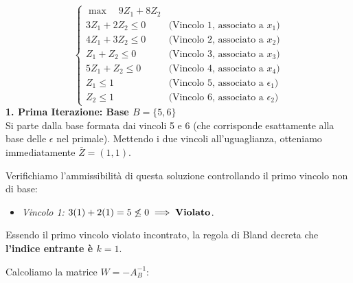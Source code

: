 \documentclass[12pt, a4paper]{article}
\begin{document}
	$$\begin{cases} \max \quad 9Z_1 + 8Z_2 \\ 3Z_1 + 2Z_2 \leq 0 \quad &\text{(Vincolo 1, associato a } x_1) \\ 4Z_1 + 3Z_2 \leq 0 \quad &\text{(Vincolo 2, associato a } x_2) \\ Z_1 + Z_2 \leq 0 \quad &\text{(Vincolo 3, associato a } x_3) \\ 5Z_1 + Z_2 \leq 0 \quad &\text{(Vincolo 4, associato a } x_4) \\ Z_1 \leq 1 \quad &\text{(Vincolo 5, associato a } \epsilon_1) \\ Z_2 \leq 1 \quad &\text{(Vincolo 6, associato a } \epsilon_2) \end{cases}$$
	\vspace{0.3cm}
	\textbf{1. Prima Iterazione: Base $B = \{5, 6\}$}\\
	Si parte dalla base formata dai vincoli 5 e 6 (che corrisponde esattamente alla base delle $\epsilon$ nel primale).
	Mettendo i due vincoli all'uguaglianza, otteniamo immediatamente $\bar{Z} = (1, 1)$.
	
	Verifichiamo l'ammissibilità di questa soluzione controllando il primo vincolo non di base:
	\begin{itemize}[label=$\circ$, itemsep=2pt, leftmargin=1.5cm]
		\item \textit{Vincolo 1:} $3(1) + 2(1) = 5 \not\leq 0 \implies \text{\textbf{Violato}}$.
	\end{itemize}
	Essendo il primo vincolo violato incontrato, la regola di Bland decreta che \textbf{l'indice entrante è $k = 1$}.
	
	Calcoliamo la matrice $W = -A_B^{-1}$:
	
\end{document}
